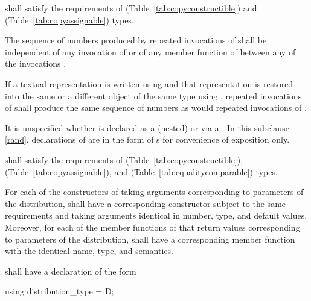 \pnum
{} shall satisfy the requirements
of  (Table~\ref{tab:copyconstructible})
and  (Table~\ref{tab:copyassignable}) types.

\pnum
The sequence of numbers
produced by repeated invocations of 
shall be independent of any invocation of
or of
any  member function of 
between any of the invocations .

\pnum
If a textual representation is written using 
and that representation is restored
into the same or a different object 
of the same type using ,
repeated invocations of 
shall produce the same sequence of numbers
as would repeated invocations of .

\pnum
It is unspecified whether 
is declared as a (nested) 
or via a .
In this subclause \ref{rand},
declarations of 
are in the form of s
for convenience of exposition only.

\pnum
{} shall satisfy the requirements
of  (Table~\ref{tab:copyconstructible}),
 (Table~\ref{tab:copyassignable}),
and
 (Table~\ref{tab:equalitycomparable}) types.

\pnum
For each of the constructors of 
taking arguments corresponding to parameters of the distribution,
 shall have a corresponding constructor
subject to the same requirements
and taking arguments identical in number, type, and default values.
Moreover,
for each of the member functions of 
that return values corresponding to parameters of the distribution,
 shall have a corresponding member function
with the identical name, type, and semantics.

\pnum
{} shall have a declaration of the form
\begin{codeblock}
using distribution_type =  D;
\end{codeblock}

%
%




